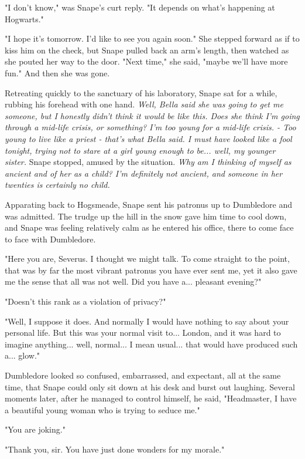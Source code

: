 \documentclass[a4paper,11pt]{article}
\begin{document}
"I don't know," was Snape's curt reply. "It depends on what's happening at Hogwarts."

"I hope it's tomorrow. I'd like to see you again soon." She stepped forward as if to kiss him on the check, but Snape pulled back an arm's length, then watched as she pouted her way to the door. "Next time," she said, "maybe we'll have more fun." And then she was gone.

Retreating quickly to the sanctuary of his laboratory, Snape sat for a while, rubbing his forehead with one hand. \emph{Well, Bella said she was going to get me someone, but I honestly didn't think it would be like this. Does she think I'm going through a mid-life crisis, or something? I'm too young for a mid-life crisis. - Too young to live like a priest - that's what Bella said. I must have looked like a fool tonight, trying not to stare at a girl young enough to be... well, my younger sister.} Snape stopped, amused by the situation. \emph{Why am I thinking of myself as ancient and of her as a child? I'm definitely not ancient, and someone in her twenties is certainly no child.}

Apparating back to Hogsmeade, Snape sent his patronus up to Dumbledore and was admitted. The trudge up the hill in the snow gave him time to cool down, and Snape was feeling relatively calm as he entered his office, there to come face to face with Dumbledore.

"Here you are, Severus. I thought we might talk. To come straight to the point, that was by far the most vibrant patronus you have ever sent me, yet it also gave me the sense that all was not well. Did you have a... pleasant evening?"

"Doesn't this rank as a violation of privacy?"

"Well, I suppose it does. And normally I would have nothing to say about your personal life. But this was your normal visit to... London, and it was hard to imagine anything... well, normal... I mean usual... that would have produced such a... glow."

Dumbledore looked so confused, embarrassed, and expectant, all at the same time, that Snape could only sit down at his desk and burst out laughing. Several moments later, after he managed to control himself, he said, "Headmaster, I have a beautiful young woman who is trying to seduce me."

"You are joking."

"Thank you, sir. You have just done wonders for my morale."
\end{document}
